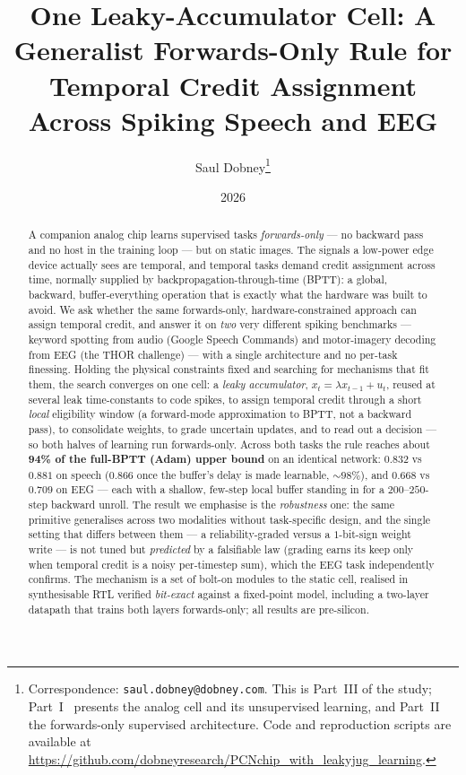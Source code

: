 \documentclass[11pt]{article}
\title{\bfseries One Leaky-Accumulator Cell: A Generalist Forwards-Only Rule for\\
Temporal Credit Assignment Across Spiking Speech and EEG}
\author{Saul Dobney\thanks{Correspondence: \texttt{saul.dobney@dobney.com}.
This is Part~III of the study; Part~I~\cite{dobney2026analog} presents the analog cell and its
unsupervised learning, and Part~II~\cite{dobney2026forwards} the forwards-only supervised
architecture. Code and reproduction scripts are available at
\url{https://github.com/dobneyresearch/PCNchip_with_leakyjug_learning}.}}
\date{2026}
\begin{document}
\maketitle

\begin{abstract}
A companion analog chip learns supervised tasks \emph{forwards-only} ---
no backward pass and no host in the training loop --- but on static
images. The signals a low-power edge device actually sees are temporal,
and temporal tasks demand credit assignment across time, normally
supplied by backpropagation-through-time (BPTT): a global, backward,
buffer-everything operation that is exactly what the hardware was built
to avoid. We ask whether the same forwards-only, hardware-constrained
approach can assign temporal credit, and answer it on \emph{two} very
different spiking benchmarks --- keyword spotting from audio (Google
Speech Commands) and motor-imagery decoding from EEG (the THOR
challenge) --- with a single architecture and no per-task finessing.
Holding the physical constraints fixed and searching for mechanisms that
fit them, the search converges on one cell: a \emph{leaky accumulator},
\(x_t = \lambda x_{t-1} + u_t\), reused at several leak time-constants
to code spikes, to assign temporal credit through a short \emph{local}
eligibility window (a forward-mode approximation to BPTT, not a backward
pass), to consolidate weights, to grade uncertain updates, and to read
out a decision --- so both halves of learning run forwards-only. Across
both tasks the rule reaches about \textbf{94\% of the full-BPTT (Adam)
upper bound} on an identical network: \(0.832\) vs \(0.881\) on speech
(\(0.866\) once the buffer's delay is made learnable, \({\sim}98\%\)),
and \(0.668\) vs \(0.709\) on EEG --- each with a shallow, few-step
local buffer standing in for a \(200\)--\(250\)-step backward unroll.
The result we emphasise is the \emph{robustness} one: the same primitive
generalises across two modalities without task-specific design, and the
single setting that differs between them --- a reliability-graded versus
a \(1\)-bit-sign weight write --- is not tuned but \emph{predicted} by a
falsifiable law (grading earns its keep only when temporal credit is a
noisy per-timestep sum), which the EEG task independently confirms. The
mechanism is a set of bolt-on modules to the static cell, realised in
synthesisable RTL verified \emph{bit-exact} against a fixed-point model,
including a two-layer datapath that trains both layers forwards-only;
all results are pre-silicon.
\end{abstract}
\end{document}
